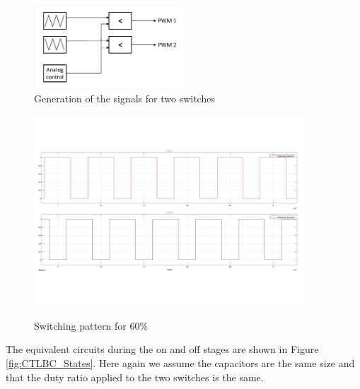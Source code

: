 \begin{figure} [H]
   \centering
   \includegraphics[width=0.5\textwidth]{figures/dConventionalThreeLevelBC/PWMGeneration.pdf}
    \caption{Generation of the signals for two switches}
	\label{fig:PWMS}
\end{figure}

\begin{figure}[H]%
    \centering
    {{\includegraphics[width=0.9\textwidth]{figures/dConventionalThreeLevelBC/PWMCompare.pdf} }}%
    \caption{Switching pattern for 60\%}%
     \label{fig:PWM12}%
\end{figure}
\vspace{-4mm}
The equivalent circuits during the on and off stages are shown in Figure \ref{fig:CTLBC_States}. Here again we assume the capacitors are the same size and that the duty ratio applied to the two switches is the same. 
\vspace{-8mm}
